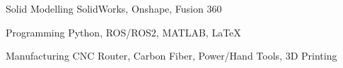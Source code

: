 

\begin{cvskills}

  \cvskill
    {Solid Modelling} %
    {SolidWorks, Onshape, Fusion 360} %

  \cvskill
    {Programming} %
    {Python, ROS/ROS2, MATLAB, LaTeX} %

  \cvskill
    {Manufacturing} %
    {CNC Router, Carbon Fiber, Power/Hand Tools, 3D Printing} %

\end{cvskills}
